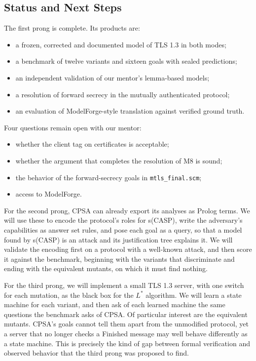 \documentclass[11pt]{article}
\begin{document}
\subsection{Status and Next Steps}
\label{subsec:status}
The first prong is complete. Its products are:
\begin{itemize}
    \item a frozen, corrected and documented model of TLS 1.3 in both modes;
    \item a benchmark of twelve variants and sixteen goals with sealed predictions;
    \item an independent validation of our mentor's lemma-based models;
    \item a resolution of forward secrecy in the mutually authenticated protocol;
    \item an evaluation of ModelForge-style translation against verified ground truth.
\end{itemize}

Four questions remain open with our mentor:
\begin{itemize}
    \item whether the client tag on certificates is acceptable;
    \item whether the argument that completes the resolution of M8 is sound;
    \item the behavior of the forward-secrecy goals in \texttt{mtls\_final.scm};
    \item access to ModelForge.
\end{itemize}

For the second prong, CPSA can already export its analyses as Prolog terms. We will use these to encode the protocol's roles for s(CASP), write the adversary's capabilities as answer set rules, and pose each goal as a query, so that a model found by s(CASP) is an attack and its justification tree explains it. We will validate the encoding first on a protocol with a well-known attack, and then score it against the benchmark, beginning with the variants that discriminate and ending with the equivalent mutants, on which it must find nothing.

For the third prong, we will implement a small TLS 1.3 server, with one switch for each mutation, as the black box for the $L^{*}$ algorithm. We will learn a state machine for each variant, and then ask of each learned machine the same questions the benchmark asks of CPSA. Of particular interest are the equivalent mutants. CPSA's goals cannot tell them apart from the unmodified protocol, yet a server that no longer checks a Finished message may well behave differently as a state machine. This is precisely the kind of gap between formal verification and observed behavior that the third prong was proposed to find.
\end{document}
